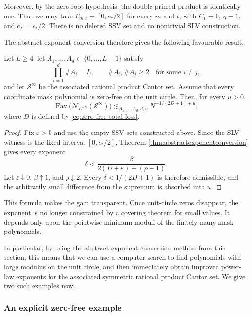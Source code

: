 \documentclass[12pt]{amsart}
\numberwithin{equation}{section}
\DeclareMathOperator{\Fav}{Fav}
\begin{document}
Moreover, by the zero-root hypothesis, the double-primed product is identically one.  Thus we may take
$
\Gamma_{m,t}=[0,c_*/2]
$
for every $m$ and $t$, with $C_1=0$, $\eta=1$, and
$c_\Gamma=c_*/2$.  There is no deleted SSV set and no nontrivial SLV
construction.  

The abstract exponent conversion therefore gives the
following favourable result.

\begin{corollary}\label{cor:zerofreedigitsets}
Let $L\geq4$, let $A_1,\ldots,A_d\subset\{0,\ldots,L-1\}$ satisfy
\[
 \prod_{i=1}^d\#A_i=L,
 \qquad
 \#A_i,\#A_j\geq2\quad\text{for some }i\ne j,
\]
and let $\mathcal S^\infty$ be the associated rational product Cantor set.
Assume that every coordinate mask polynomial is zero-free on the unit circle.
Then, for every $u>0$,
\[
 \Fav\bigl(\mathcal N_{L^{-N}}(\mathcal S^\infty)\bigr)
 \lesssim_{A_1,\ldots,A_d,d,u}
 N^{-1/(2D+1)+u},
\]
where $D$ is defined by \eqref{eq:zero-free-total-loss}.
\end{corollary}

\begin{proof}
Fix $\varepsilon>0$ and use the empty SSV sets constructed above.  Since the
SLV witness is the fixed interval $[0,c_*/2]$, Theorem
\ref{thm:abstractexponentconversion} gives every exponent
\[
 \delta<
 \frac{\beta}{2(D+\varepsilon)+(\rho-1)}.
\]
Let $\varepsilon\downarrow0$, $\beta\uparrow1$, and $\rho\downarrow2$.
Every $\delta<1/(2D+1)$ is therefore admissible, and the arbitrarily small
difference from the supremum is absorbed into $u$.
\end{proof}

This formula makes the gain transparent.  Once unit-circle zeros disappear,
the exponent is no longer constrained by a covering theorem for small values.
It depends only upon the pointwise minimum moduli of the finitely many mask
polynomials.

In particular, by using the abstract exponent conversion method from this section, this means that we can use a computer search to find polynomials with large modulus on the unit circle, and then immediately obtain improved power-law exponents for the associated symmetric rational product Cantor set. We give two such examples now.

\subsubsection{An explicit zero-free example}
\end{document}
